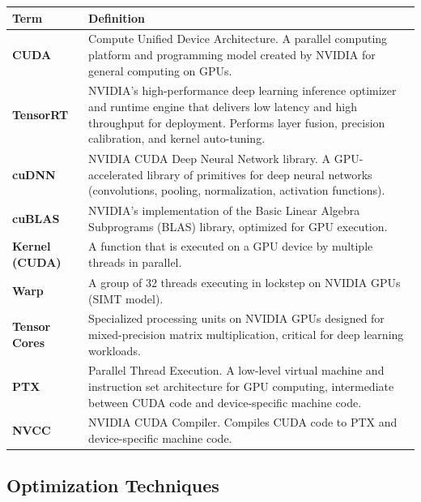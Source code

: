 \documentclass[11pt]{article}
\begin{document}
\begin{longtable}{|p{}|p{}|}
\hline
\textbf{Term} & \textbf{Definition} \\
\hline
\endhead
\textbf{CUDA} & Compute Unified Device Architecture. A parallel computing platform and programming model created by NVIDIA for general computing on GPUs. \\
\hline
\textbf{TensorRT} & NVIDIA's high-performance deep learning inference optimizer and runtime engine that delivers low latency and high throughput for deployment. Performs layer fusion, precision calibration, and kernel auto-tuning. \\
\hline
\textbf{cuDNN} & NVIDIA CUDA Deep Neural Network library. A GPU-accelerated library of primitives for deep neural networks (convolutions, pooling, normalization, activation functions). \\
\hline
\textbf{cuBLAS} & NVIDIA's implementation of the Basic Linear Algebra Subprograms (BLAS) library, optimized for GPU execution. \\
\hline
\textbf{Kernel (CUDA)} & A function that is executed on a GPU device by multiple threads in parallel. \\
\hline
\textbf{Warp} & A group of 32 threads executing in lockstep on NVIDIA GPUs (SIMT model). \\
\hline
\textbf{Tensor Cores} & Specialized processing units on NVIDIA GPUs designed for mixed-precision matrix multiplication, critical for deep learning workloads. \\
\hline
\textbf{PTX} & Parallel Thread Execution. A low-level virtual machine and instruction set architecture for GPU computing, intermediate between CUDA code and device-specific machine code. \\
\hline
\textbf{NVCC} & NVIDIA CUDA Compiler. Compiles CUDA code to PTX and device-specific machine code. \\
\hline
\end{longtable}

\subsection{Optimization Techniques}
\end{document}
